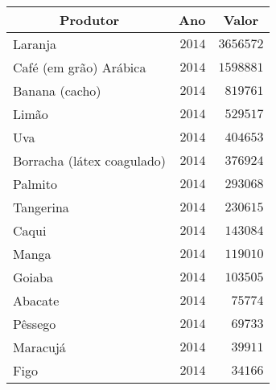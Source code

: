 \begin{table}[!tbp]
\begin{center}
\begin{tabular}{lrr}
\hline\hline
\multicolumn{1}{c}{Produtor}&\multicolumn{1}{c}{Ano}&\multicolumn{1}{c}{Valor}\tabularnewline
\hline
Laranja&$2014$&$3656572$\tabularnewline
Café (em grão) Arábica&$2014$&$1598881$\tabularnewline
Banana (cacho)&$2014$&$ 819761$\tabularnewline
Limão&$2014$&$ 529517$\tabularnewline
Uva&$2014$&$ 404653$\tabularnewline
Borracha (látex coagulado)&$2014$&$ 376924$\tabularnewline
Palmito&$2014$&$ 293068$\tabularnewline
Tangerina&$2014$&$ 230615$\tabularnewline
Caqui&$2014$&$ 143084$\tabularnewline
Manga&$2014$&$ 119010$\tabularnewline
Goiaba&$2014$&$ 103505$\tabularnewline
Abacate&$2014$&$  75774$\tabularnewline
Pêssego&$2014$&$  69733$\tabularnewline
Maracujá&$2014$&$  39911$\tabularnewline
Figo&$2014$&$  34166$\tabularnewline
\hline
\end{tabular}\end{center}

\end{table}
